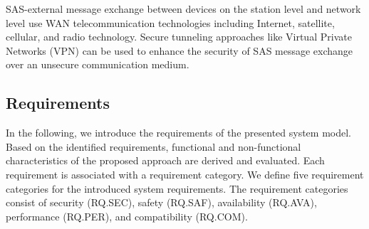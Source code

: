 SAS-external message exchange between devices on the station level and network level use WAN telecommunication technologies including Internet, satellite, cellular, and radio technology.
Secure tunneling approaches like Virtual Private Networks (VPN) can be used to enhance the security of SAS message exchange over an unsecure communication medium.

\subsection{Requirements}
In the following, we introduce the requirements of the presented system model.
Based on the identified requirements, functional and non-functional characteristics of the proposed approach are derived and evaluated.
Each requirement is associated with a requirement category.
We define five requirement categories for the introduced system requirements.
The requirement categories consist of security (RQ.SEC), safety (RQ.SAF), availability (RQ.AVA), performance (RQ.PER), and compatibility (RQ.COM).

